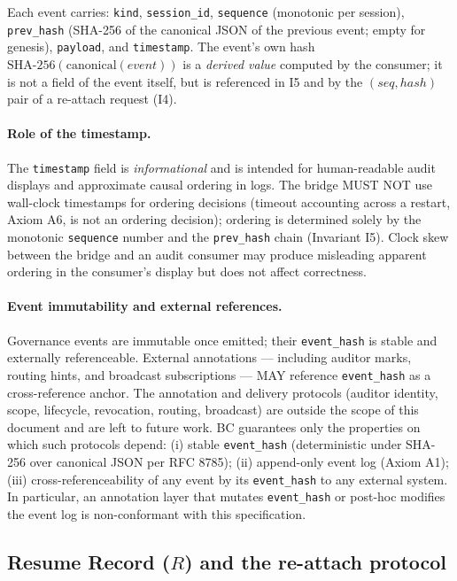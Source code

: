 Each event carries: \texttt{kind}, \texttt{session\_id},
\texttt{sequence} (monotonic per session), \texttt{prev\_hash}
(SHA-256 of the canonical JSON of the previous event; empty for genesis),
\texttt{payload}, and \texttt{timestamp}. The event's own hash
$\mathrm{SHA\text{-}256}(\mathrm{canonical}(\mathit{event}))$ is a
\emph{derived value} computed by the consumer; it is not a field
of the event itself, but is referenced in I5 and by the $(\mathit{seq},
\mathit{hash})$ pair of a re-attach request (I4).

\paragraph{Role of the timestamp.}
The \texttt{timestamp} field is \emph{informational} and is intended
for human-readable audit displays and approximate causal ordering in
logs. The bridge MUST NOT use wall-clock timestamps for ordering
decisions (timeout accounting across a restart, Axiom A6, is not an
ordering decision); ordering is determined solely by the monotonic
\texttt{sequence} number and the \texttt{prev\_hash} chain
(Invariant I5). Clock skew between the bridge and an audit consumer
may produce misleading apparent ordering in the consumer's display but
does not affect correctness.

\paragraph{Event immutability and external references.}
Governance events are immutable once emitted; their \texttt{event\_hash}
is stable and externally referenceable. External annotations ---
including auditor marks, routing hints, and broadcast subscriptions ---
MAY reference \texttt{event\_hash} as a cross-reference anchor. The
annotation and delivery protocols (auditor identity, scope, lifecycle,
revocation, routing, broadcast) are outside the scope of this document
and are left to future work. BC guarantees only the properties
on which such protocols depend: (i) stable \texttt{event\_hash}
(deterministic under SHA-256 over canonical JSON per RFC 8785); (ii)
append-only event log (Axiom A1); (iii) cross-referenceability of any
event by its \texttt{event\_hash} to any external system. In
particular, an annotation layer that mutates \texttt{event\_hash} or
post-hoc modifies the event log is non-conformant with this
specification.

\subsection{Resume Record ($R$) and the re-attach protocol}

